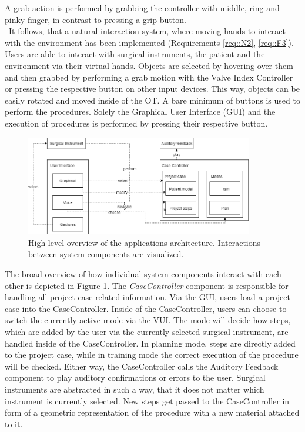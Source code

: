 A grab action is performed by grabbing the controller with middle, ring and pinky finger, in contrast to pressing a grip button.
\\ It follows, that a natural interaction system, where moving hands to interact with the environment has been implemented (Requirements \ref{req::N2}, \ref{req::F3}).
Users are able to interact with surgical instruments, the patient and the environment via their virtual hands.
Objects are selected by hovering over them and then grabbed by performing a grab motion with the Valve Index Controller or pressing the respective button on other input devices.
This way, objects can be easily rotated and moved inside of the OT.
A bare minimum of buttons is used to perform the procedures.
Solely the Graphical User Interface (GUI) and the execution of procedures is performed by pressing their respective button.

\begin{figure}[ht]
    \centering
    \includegraphics[width=375px]{images/implementation/architecture.png}
    \caption{\label{fig::ImplementationArchitecture}High-level overview of the applications architecture. Interactions between system components are visualized.}
\end{figure}

The broad overview of how individual system components interact with each other is depicted in Figure \ref{fig::ImplementationArchitecture}.
The \emph{CaseController} component is responsible for handling all project case related information.
Via the GUI, users load a project case into the CaseController.
Inside of the CaseController, users can choose to switch the currently active mode via the VUI.
The mode will decide how steps, which are added by the user via the currently selected surgical instrument, are handled inside of the CaseController.
In planning mode, steps are directly added to the project case, while in training mode the correct execution of the procedure will be checked.
Either way, the CaseController calls the Auditory Feedback component to play auditory confirmations or errors to the user.
Surgical instruments are abstracted in such a way, that it does not matter which instrument is currently selected.
New steps get passed to the CaseController in form of a geometric representation of the procedure with a new material attached to it.
